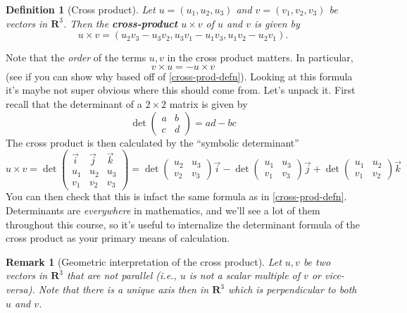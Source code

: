 \documentclass[12pt]{article}
\numberwithin{equation}{subsection}
\numberwithin{figure}{subsection}
\newtheorem{defn}[subsection]{Definition}
\theoremstyle{note}
\newtheorem{remark}[subsection]{Remark}
\begin{document}
{\begin{defn}[Cross product] Let $u=(u_1,u_2,u_3)$ and $v=(v_1,v_2,v_3)$  be vectors in $\mathbf{R}^3$. Then the \textbf{cross-product} $u\times v$ of $u$ and $v$ is given by \begin{equation} u\times v= (u_2v_3 - u_3v_2, u_3v_1-u_1v_3, u_1v_2-u_2 v_1).\label{cross-prod-defn}\end{equation}
\end{defn}

Note that the \textit{order} of the terms $u,v$ in the cross product matters. In particular, \[ v\times u=- u \times v\] (see if you can show why based off of \eqref{cross-prod-defn}). Looking at this formula it's maybe not super obvious where this should come from. Let's unpack it. First recall that the determinant of a $2\times 2$ matrix is given by \[ \det\begin{pmatrix} a & b \\ c & d\end{pmatrix} =ad-bc\] The cross product is then calculated by the ``symbolic determinant'' \begin{equation} u\times v= \det \begin{pmatrix} \vec{i} & \vec{j} & \vec{k} \\ u_1 & u_2 & u_3 \\ v_1 & v_2 & v_3 \end{pmatrix} = 
\det\begin{pmatrix} u_2 & u_3 \\ v_2 & v_3 \end{pmatrix} \vec{i} 
- \det \begin{pmatrix} u_1 & u_3 \\ v_1 & v_3 \end{pmatrix} \vec{j} 
+ \det \begin{pmatrix} u_1 & u_2 \\ v_1 & v_2 \end{pmatrix} \vec{k} \end{equation}
You can then check that this is infact the same formula as in \eqref{cross-prod-defn}. Determinants are \textit{everywhere} in mathematics, and we'll see a lot of them throughout this course, so it's useful to internalize the determinant formula of the cross product as your primary means of calculation.

\begin{remark}[Geometric interpretation of the cross product]
Let $u,v$ be two vectors in $\mathbf{R}^3$ that are not parallel (i.e., $u$ is not a scalar multiple of $v$ or vice-versa). Note that there is a unique axis then in $\mathbf{R}^3$ which is perpendicular to both $u$ and $v$. 




\end{remark}}
\end{document}
